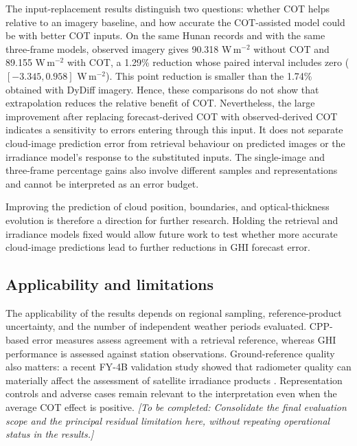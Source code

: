 \documentclass[11pt]{article}
\newcommand{\pending}[1]{\textit{[To be completed: #1]}}
\begin{document}
The input-replacement results distinguish two questions: whether COT helps relative to an imagery baseline, and how accurate the COT-assisted model could be with better COT inputs. On the same Hunan records and with the same three-frame models, observed imagery gives 90.318 W\,m$^{-2}$ without COT and 89.155 W\,m$^{-2}$ with COT, a 1.29\% reduction whose paired interval includes zero ($[-3.345,0.958]$ W\,m$^{-2}$). This point reduction is smaller than the 1.74\% obtained with DyDiff imagery. Hence, these comparisons do not show that extrapolation reduces the relative benefit of COT. Nevertheless, the large improvement after replacing forecast-derived COT with observed-derived COT indicates a sensitivity to errors entering through this input. It does not separate cloud-image prediction error from retrieval behaviour on predicted images or the irradiance model's response to the substituted inputs. The single-image and three-frame percentage gains also involve different samples and representations and cannot be interpreted as an error budget.

Improving the prediction of cloud position, boundaries, and optical-thickness evolution is therefore a direction for further research. Holding the retrieval and irradiance models fixed would allow future work to test whether more accurate cloud-image predictions lead to further reductions in GHI forecast error.

\subsection{Applicability and limitations}
The applicability of the results depends on regional sampling, reference-product uncertainty, and the number of independent weather periods evaluated. CPP-based error measures assess agreement with a retrieval reference, whereas GHI performance is assessed against station observations. Ground-reference quality also matters: a recent FY-4B validation study showed that radiometer quality can materially affect the assessment of satellite irradiance products \cite{chen2025fy4b}. Representation controls and adverse cases remain relevant to the interpretation even when the average COT effect is positive. \pending{Consolidate the final evaluation scope and the principal residual limitation here, without repeating operational status in the results.}
\end{document}
